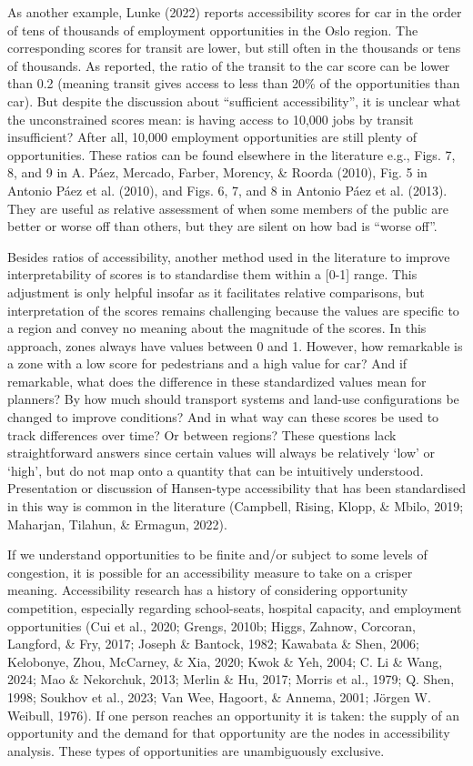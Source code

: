 \documentclass[
11pt, %
oneside, %
english, %
singlespacing, %
]{macthesis} %
\begin{document}
As another example, Lunke (2022) reports accessibility scores for car in the order of tens of thousands of employment opportunities in the Oslo region. The corresponding scores for transit are lower, but still often in the thousands or tens of thousands. As reported, the ratio of the transit to the car score can be lower than 0.2 (meaning transit gives access to less than 20\% of the opportunities than car). But despite the discussion about ``sufficient accessibility'', it is unclear what the unconstrained scores mean: is having access to 10,000 jobs by transit insufficient? After all, 10,000 employment opportunities are still plenty of opportunities. These ratios can be found elsewhere in the literature e.g., Figs. 7, 8, and 9 in A. Páez, Mercado, Farber, Morency, \& Roorda (2010), Fig. 5 in Antonio Páez et al. (2010), and Figs. 6, 7, and 8 in Antonio Páez et al. (2013). They are useful as relative assessment of when some members of the public are better or worse off than others, but they are silent on how bad is ``worse off''.

Besides ratios of accessibility, another method used in the literature to improve interpretability of scores is to standardise them within a {[}0-1{]} range. This adjustment is only helpful insofar as it facilitates relative comparisons, but interpretation of the scores remains challenging because the values are specific to a region and convey no meaning about the magnitude of the scores. In this approach, zones always have values between 0 and 1. However, how remarkable is a zone with a low score for pedestrians and a high value for car? And if remarkable, what does the difference in these standardized values mean for planners? By how much should transport systems and land-use configurations be changed to improve conditions? And in what way can these scores be used to track differences over time? Or between regions? These questions lack straightforward answers since certain values will always be relatively `low' or `high', but do not map onto a quantity that can be intuitively understood. Presentation or discussion of Hansen-type accessibility that has been standardised in this way is common in the literature (Campbell, Rising, Klopp, \& Mbilo, 2019; Maharjan, Tilahun, \& Ermagun, 2022).

If we understand opportunities to be finite and/or subject to some levels of congestion, it is possible for an accessibility measure to take on a crisper meaning. Accessibility research has a history of considering opportunity competition, especially regarding school-seats, hospital capacity, and employment opportunities (Cui et al., 2020; Grengs, 2010b; Higgs, Zahnow, Corcoran, Langford, \& Fry, 2017; Joseph \& Bantock, 1982; Kawabata \& Shen, 2006; Kelobonye, Zhou, McCarney, \& Xia, 2020; Kwok \& Yeh, 2004; C. Li \& Wang, 2024; Mao \& Nekorchuk, 2013; Merlin \& Hu, 2017; Morris et al., 1979; Q. Shen, 1998; Soukhov et al., 2023; Van Wee, Hagoort, \& Annema, 2001; Jörgen W. Weibull, 1976). If one person reaches an opportunity it is taken: the supply of an opportunity and the demand for that opportunity are the nodes in accessibility analysis. These types of opportunities are unambiguously exclusive.
\end{document}
